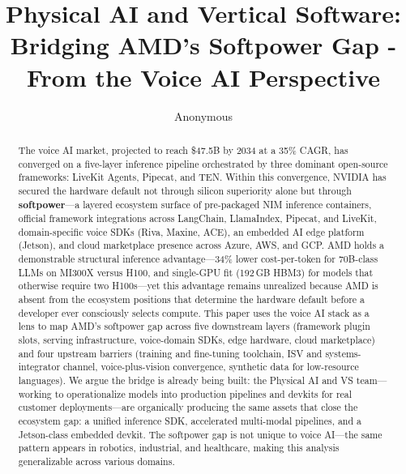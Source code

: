 \documentclass[blind]{gtac}
\title{{Physical AI and Vertical Software: Bridging AMD's Softpower Gap - From the Voice AI Perspective}}
\author{Anonymous}
\begin{document}
\maketitle

\pagestyle{fancy}
\fancyhf{}
\cfoot{\thepage}
\renewcommand{\headrulewidth}{0pt}
\thispagestyle{fancy}

\begin{abstract}
The voice AI market, projected to reach \$47.5B by 2034 at a 35\% CAGR, has converged on a five-layer inference pipeline orchestrated by three dominant open-source frameworks: LiveKit Agents, Pipecat, and TEN. Within this convergence, NVIDIA has secured the hardware default not through silicon superiority alone but through \textbf{softpower}---a layered ecosystem surface of pre-packaged NIM inference containers, official framework integrations across LangChain, LlamaIndex, Pipecat, and LiveKit, domain-specific voice SDKs (Riva, Maxine, ACE), an embedded AI edge platform (Jetson), and cloud marketplace presence across Azure, AWS, and GCP. AMD holds a demonstrable structural inference advantage---34\% lower cost-per-token for 70B-class LLMs on MI300X versus H100, and single-GPU fit (192\,GB HBM3) for models that otherwise require two H100s---yet this advantage remains unrealized because AMD is absent from the ecosystem positions that determine the hardware default before a developer ever consciously selects compute. This paper uses the voice AI stack as a lens to map AMD's softpower gap across five downstream layers (framework plugin slots, serving infrastructure, voice-domain SDKs, edge hardware, cloud marketplace) and four upstream barriers (training and fine-tuning toolchain, ISV and systems-integrator channel, voice-plus-vision convergence, synthetic data for low-resource languages). We argue the bridge is already being built: the Physical AI and VS team---working to operationalize models into production pipelines and devkits for real customer deployments---are organically producing the same assets that close the ecosystem gap: a unified inference SDK, accelerated multi-modal pipelines, and a Jetson-class embedded devkit. The softpower gap is not unique to voice AI---the same pattern appears in robotics, industrial, and healthcare, making this analysis generalizable across various domains.
\end{abstract}

\end{document}
